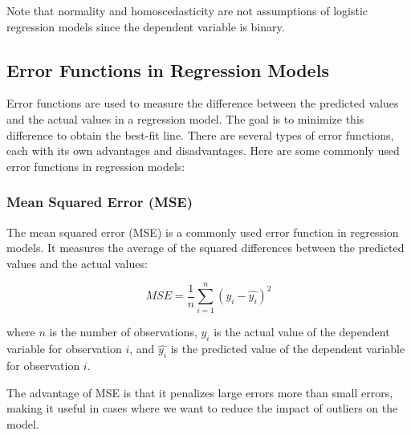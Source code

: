 \documentclass{article}
\begin{document}
Note that normality and homoscedasticity are not assumptions of logistic regression models since the dependent variable is binary.

\subsection{Error Functions in Regression Models}

Error functions are used to measure the difference between the predicted values and the actual values in a regression model. The goal is to minimize this difference to obtain the best-fit line. There are several types of error functions, each with its own advantages and disadvantages. Here are some commonly used error functions in regression models:

\subsubsection{Mean Squared Error (MSE)}
\begin{center}
    \end{center}
The mean squared error (MSE) is a commonly used error function in regression models. It measures the average of the squared differences between the predicted values and the actual values:

\begin{equation}
MSE = \frac{1}{n}\sum_{i=1}^{n}(y_i - \hat{y_i})^2
\end{equation}

where $n$ is the number of observations, $y_i$ is the actual value of the dependent variable for observation $i$, and $\hat{y_i}$ is the predicted value of the dependent variable for observation $i$.

The advantage of MSE is that it penalizes large errors more than small errors, making it useful in cases where we want to reduce the impact of outliers on the model.
\end{document}
